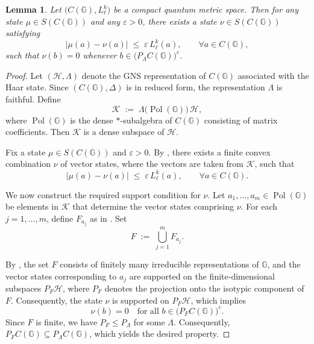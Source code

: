 \documentclass[12pt, reqno]{amsart}
\newtheorem{lemma}[theorem]{Lemma}
\theoremstyle{definition}
\theoremstyle{remark}
\numberwithin{equation}{section}
\begin{document}
\begin{lemma}\label{lem:approx_state}
Let \(\bigl(C(\mathbb{G}), L_\ell^k\bigr)\) be a compact quantum metric space. 
Then for any state \(\mu \in S(C(\mathbb{G}))\) and any \(\varepsilon > 0\), there 
exists a state \(\nu \in S(C(\mathbb{G}))\) satisfying
\[
|\mu(a) - \nu(a)| \;\leq\; \varepsilon \, L_\ell^k(a), \qquad \forall a \in C(\mathbb{G}),
\]
such that \(\nu(b) = 0\) whenever 
\(b \in \bigl(P_\Lambda C(\mathbb{G})\bigr)^c\).
\end{lemma}

\begin{proof}
Let \((\mathcal{H}, \Lambda)\) denote the GNS representation of \(C(\mathbb{G})\) 
associated with the Haar state. Since \((C(\mathbb{G}), \Delta)\) is in reduced 
form, the representation \(\Lambda\) is faithful. Define
\[
\mathcal{K} \;:=\; \Lambda\bigl(\operatorname{Pol}(\mathbb{G})\bigr)\,\mathcal{H},
\]
where \(\operatorname{Pol}(\mathbb{G})\) is the dense \(*\)-subalgebra of 
\(C(\mathbb{G})\) consisting of matrix coefficients. Then \(\mathcal{K}\) is 
a dense subspace of \(\mathcal{H}\).

Fix a state \(\mu \in S(C(\mathbb{G}))\) and \(\varepsilon > 0\). By 
\cite[Proposition~4.7]{11}, there exists a finite convex combination 
\(\nu\) of vector states, where the vectors are taken from \(\mathcal{K}\), 
such that
\[
|\mu(a) - \nu(a)| \;\leq\; \varepsilon \, L_\ell^k(a), \qquad \forall a \in C(\mathbb{G}).
\]

We now construct the required support condition for \(\nu\). Let 
\(a_1, \dots, a_m \in \operatorname{Pol}(\mathbb{G})\) be  elements 
in \(\mathcal{K}\) that determine the vector states comprising \(\nu\). For 
each \(j = 1, \dots, m\), define \(F_{a_j}\) as in \cite[Proposition~2.2]{11}. 
Set
\[
F \;:=\; \bigcup_{j=1}^m F_{a_j}.
\]

By \cite[Proposition~2.2]{11}, the set \(F\) consists of finitely many 
irreducible representations of \(\mathbb{G}\), and the vector states 
corresponding to \(a_j\) are supported on the finite-dimensional subspaces 
\(P_F \mathcal{H}\), where \(P_F\) denotes the projection onto the isotypic 
component of \(F\). Consequently, the state \(\nu\) is supported on 
\(P_F \mathcal{H}\), which implies
\[
\nu(b) = 0 \quad \text{for all } b \in \bigl(P_F C(\mathbb{G}) \bigr)^c.
\]
Since \(F\) is finite, we have \(P_F \leq P_\Lambda\) for some \(\Lambda\). 
Consequently, \(P_F C(\mathbb{G})  \subseteq P_\Lambda C(\mathbb{G})\), 
which yields the desired property.
\end{proof}
\end{document}
